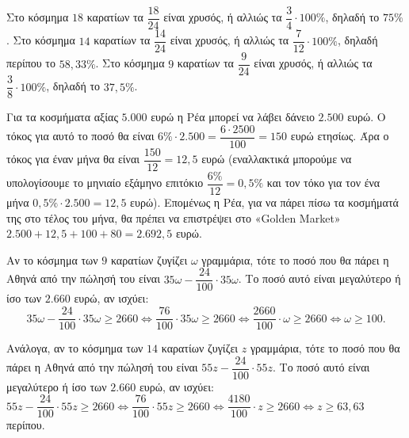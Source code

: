 
\begin{alist}
\item Στο κόσμημα $18$ καρατίων τα $\dfrac{18}{24}$ είναι χρυσός, ή αλλιώς τα $\dfrac{3}{4} \cdot 100\%$, δηλαδή το $75\%$. Στο κόσμημα $14$ καρατίων τα $\dfrac{14}{24}$ είναι χρυσός, ή αλλιώς τα $\dfrac{7}{12} \cdot 100\%$, δηλαδή περίπου το $58,33\%$. Στο κόσμημα $9$ καρατίων τα $\dfrac{9}{24}$ είναι χρυσός, ή αλλιώς τα $\dfrac{3}{8} \cdot 100\%$, δηλαδή το
$37,5\%$.
\item Για τα κοσμήματα αξίας $5.000$ ευρώ η Ρέα μπορεί να λάβει δάνειο $2.500$ ευρώ. Ο τόκος
για αυτό το ποσό θα είναι $6\% \cdot 2.500 = \dfrac{6 \cdot 2500}{100} = 150$ ευρώ ετησίως. Άρα ο τόκος για έναν μήνα θα είναι $\dfrac{150}{12} = 12,5$ ευρώ (εναλλακτικά μπορούμε να υπολογίσουμε το μηνιαίο εξάμηνο επιτόκιο $\dfrac{6\%}{12} = 0,5\%$ και τον τόκο για τον ένα μήνα $0,5\% \cdot 2.500 = 12,5$ ευρώ). Επομένως η Ρέα, για να πάρει πίσω τα κοσμήματά της στο τέλος του μήνα, θα πρέπει να επιστρέψει στο «Golden Market» $2.500 + 12,5 + 100 + 80 = 2.692,5$ ευρώ.
\item Αν το κόσμημα των $9$ καρατίων ζυγίζει $\omega$ γραμμάρια, τότε το ποσό που θα πάρει η Αθηνά από την πώλησή του είναι $35\omega - \dfrac{24}{100} \cdot 35\omega$. Το ποσό αυτό είναι μεγαλύτερο ή ίσο των $2.660$ ευρώ, αν ισχύει:
\[35\omega - \dfrac{24}{100} \cdot 35\omega \ge 2660 \Leftrightarrow \dfrac{76}{100} \cdot 35\omega \ge 2660 \Leftrightarrow \dfrac{2660}{100} \cdot \omega \ge 2660 \Leftrightarrow \omega \ge 100.\]

Ανάλογα, αν το κόσμημα των $14$ καρατίων ζυγίζει $z$ γραμμάρια, τότε το ποσό που θα πάρει η Αθηνά από την πώλησή του είναι $55z - \dfrac{24}{100} \cdot 55z$. Το ποσό αυτό είναι μεγαλύτερο ή ίσο των $2.660$ ευρώ, αν ισχύει:
$55z - \dfrac{24}{100} \cdot 55z \ge 2660 \Leftrightarrow \dfrac{76}{100} \cdot 55z \ge 2660 \Leftrightarrow \dfrac{4180}{100} \cdot z \ge 2660 \Leftrightarrow z \ge 63,63$ περίπου.
\end{alist}

